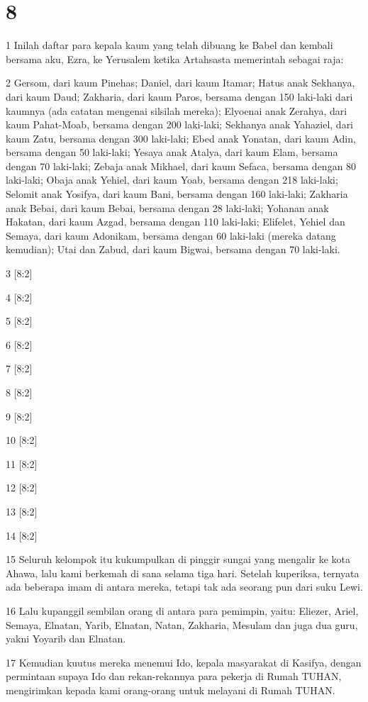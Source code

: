 \chapter{8}

\par 1 Inilah daftar para kepala kaum yang telah dibuang ke Babel dan kembali bersama aku, Ezra, ke Yerusalem ketika Artahsasta memerintah sebagai raja:
\par 2 Gersom, dari kaum Pinehas; Daniel, dari kaum Itamar; Hatus anak Sekhanya, dari kaum Daud; Zakharia, dari kaum Paros, bersama dengan 150 laki-laki dari kaumnya (ada catatan mengenai silsilah mereka); Elyoenai anak Zerahya, dari kaum Pahat-Moab, bersama dengan 200 laki-laki; Sekhanya anak Yahaziel, dari kaum Zatu, bersama dengan 300 laki-laki; Ebed anak Yonatan, dari kaum Adin, bersama dengan 50 laki-laki; Yesaya anak Atalya, dari kaum Elam, bersama dengan 70 laki-laki; Zebaja anak Mikhael, dari kaum Sefaca, bersama dengan 80 laki-laki; Obaja anak Yehiel, dari kaum Yoab, bersama dengan 218 laki-laki; Selomit anak Yosifya, dari kaum Bani, bersama dengan 160 laki-laki; Zakharia anak Bebai, dari kaum Bebai, bersama dengan 28 laki-laki; Yohanan anak Hakatan, dari kaum Azgad, bersama dengan 110 laki-laki; Elifelet, Yehiel dan Semaya, dari kaum Adonikam, bersama dengan 60 laki-laki (mereka datang kemudian); Utai dan Zabud, dari kaum Bigwai, bersama dengan 70 laki-laki.
\par 3 [8:2]
\par 4 [8:2]
\par 5 [8:2]
\par 6 [8:2]
\par 7 [8:2]
\par 8 [8:2]
\par 9 [8:2]
\par 10 [8:2]
\par 11 [8:2]
\par 12 [8:2]
\par 13 [8:2]
\par 14 [8:2]
\par 15 Seluruh kelompok itu kukumpulkan di pinggir sungai yang mengalir ke kota Ahawa, lalu kami berkemah di sana selama tiga hari. Setelah kuperiksa, ternyata ada beberapa imam di antara mereka, tetapi tak ada seorang pun dari suku Lewi.
\par 16 Lalu kupanggil sembilan orang di antara para pemimpin, yaitu: Eliezer, Ariel, Semaya, Elnatan, Yarib, Elnatan, Natan, Zakharia, Mesulam dan juga dua guru, yakni Yoyarib dan Elnatan.
\par 17 Kemudian kuutus mereka menemui Ido, kepala masyarakat di Kasifya, dengan permintaan supaya Ido dan rekan-rekannya para pekerja di Rumah TUHAN, mengirimkan kepada kami orang-orang untuk melayani di Rumah TUHAN.
